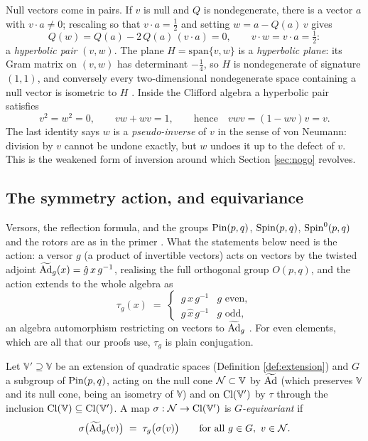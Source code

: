 Null vectors come in pairs. If $v$ is null and $Q$ is nondegenerate, there is a vector $a$ with $v \cdot a \neq 0$; rescaling so that $v \cdot a = \tfrac12$ and setting $w = a - Q(a)\,v$ gives
\[
Q(w) = Q(a) - 2\,Q(a)\,(v \cdot a) = 0, \qquad v \cdot w = v \cdot a = \tfrac12 :
\]
a \emph{hyperbolic pair} $(v, w)$. The plane $H = \mathrm{span}\{v, w\}$ is a \emph{hyperbolic plane}: its Gram matrix on $(v,w)$ has determinant $-\tfrac14$, so $H$ is nondegenerate of signature $(1,1)$, and conversely every two-dimensional nondegenerate space containing a null vector is isometric to $H$ \cite{Lam2005}. Inside the Clifford algebra a hyperbolic pair satisfies
\begin{equation}\label{eq:hyperbolicpair}
v^2 = w^2 = 0, \qquad vw + wv = 1, \qquad \text{hence} \quad vwv = (1 - wv)v = v .
\end{equation}
The last identity says $w$ is a \emph{pseudo-inverse} of $v$ in the sense of von Neumann: division by $v$ cannot be undone exactly, but $w$ undoes it up to the defect of $v$. This is the weakened form of inversion around which Section \ref{sec:nogo} revolves.

\subsection{The symmetry action, and equivariance}\label{subsec:groups}

Versors, the reflection formula, and the groups $\mathrm{Pin}(p,q)$, $\mathrm{Spin}(p,q)$, $\mathrm{Spin}^0(p,q)$ and the rotors are as in the primer \cite[Section 6]{ButlerT0}. What the statements below need is the action: a versor $g$ (a product of invertible vectors) acts on vectors by the twisted adjoint $\widetilde{\mathrm{Ad}}_g(x) = \hat{g}\, x\, g^{-1}$, realising the full orthogonal group $O(p,q)$, and the action extends to the whole algebra as
\begin{equation}\label{eq:tau}
\tau_g(x) \;=\;
\begin{cases}
\,g\, x\, g^{-1} & g \text{ even},\\[2pt]
\,g\, \hat{x}\, g^{-1} & g \text{ odd},
\end{cases}
\end{equation}
an algebra automorphism restricting on vectors to $\widetilde{\mathrm{Ad}}_g$ \cite[Lemma 9.2]{ButlerT0}. For even elements, which are all that our proofs use, $\tau_g$ is plain conjugation.

\begin{definition}[Equivariance]\label{def:equivariance}
Let $\mathbb{V}' \supseteq \mathbb{V}$ be an extension of quadratic spaces (Definition \ref{def:extension}) and $G$ a subgroup of $\mathrm{Pin}(p,q)$, acting on the null cone $\mathcal{N} \subset \mathbb{V}$ by $\widetilde{\mathrm{Ad}}$ (which preserves $\mathbb{V}$ and its null cone, being an isometry of $\mathbb{V}$) and on $\mathrm{Cl}(\mathbb{V}')$ by $\tau$ through the inclusion $\mathrm{Cl}(\mathbb{V}) \subseteq \mathrm{Cl}(\mathbb{V}')$. A map $\sigma : \mathcal{N} \to \mathrm{Cl}(\mathbb{V}')$ is \emph{$G$-equivariant} if
\[
\sigma\bigl(\widetilde{\mathrm{Ad}}_g(v)\bigr) \;=\; \tau_g\bigl(\sigma(v)\bigr) \qquad \text{for all } g \in G,\ v \in \mathcal{N} .
\]
\end{definition}

